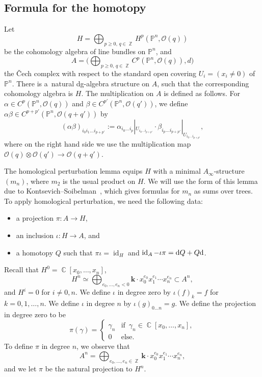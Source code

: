 \documentclass[10pt,a4paper]{amsart}
\numberwithin{equation}{section}
\DeclareMathOperator\C{\mathbb C}
\DeclareMathOperator\Z{\mathbb Z}
\renewcommand{\P}{{\mathbb P}}
\newcommand{\OO}{{\mathcal O}}
\newcommand{\sub}{\subset}
\newcommand{\id}{\operatorname{id}}
\renewcommand{\k}{{\mathbf{k}}}
\begin{document}
\subsection{Formula for the homotopy}

Let
\[
H=\bigoplus_{p\geq 0,\, q\in \Z}H^p(\P^n,\OO(q))
\]
be the cohomology algebra of line bundles on $\P^n$, and
\[
A=\Big(\bigoplus_{p\geq 0,\, q\in\Z} C^p (\P^n,\OO(q)),d\Big)
\]
the \v{C}ech complex with respect to the standard open covering $U_i=(x_i\neq 0)$ of $\P^n$.
There is a~natural dg-algebra structure on $A$, such that the corresponding cohomology algebra is
$H$. The multiplication on $A$ is defined as follows. For $\alpha \in C^p(\P^n,\OO(q))$ and $\beta\in C^{p'}(\P^n,\OO(q'))$, we define $\alpha\beta\in C^{p+p'}(\P^n,\OO(q+q'))$ by
\[
(\alpha\beta)_{i_0i_1\dots i_{p+p'}}:=\alpha_{i_0\dots i_p}|_{U_{i_0\dots i_{p+p'}}}\cdot \beta_{i_p\dots i_{p+p'}}|_{U_{i_0\dots i_{p+p'}}},
\]
where on the right hand side we use the multiplication map $\OO(q)\otimes \OO(q')\to \OO(q+q')$.

The homological perturbation lemma equips $H$ with a minimal $A_\infty$-structure $(m_n)$, where $m_2$ is the
usual product on $H$. We will use the form of this lemma due to Kontsevich--Soibelman~\cite{KS}, which gives formulas
for $m_n$ as sums over trees. To apply homological perturbation, we need the following data:
\begin{itemize}\itemsep=0pt
\item a projection $\pi\colon  A\to H$,
\item an inclusion $\iota\colon  H\to A$, and
\item a homotopy $Q$ such that $\pi\iota=\id_H$ and $\id_A-\iota\pi={\rm d}Q+Q{\rm d}$.
\end{itemize}
Recall that
 $H^0=\C[x_0,\dots ,x_n]$,
 \[
 H^n\simeq \bigoplus_{e_0,\dots ,e_n<0} \k\cdot x_0^{e_0}x_1^{e_1}\cdots x_n^{e_n}\sub A^n,
 \]
 and $H^i=0$ for $i\neq 0,n$. We define $\iota$ in degree zero by $\iota(f)_k=f$
 for $k=0,1,\dots ,n$. We define $\iota$ in degree $n$ by $\iota(g)_{0\ldots n}=g$. We define the projection
 in degree zero to be
\[
\pi(\gamma)=\begin{cases}
\gamma_n & \text{if } \, \gamma_n\in \C[x_0,\dots ,x_n],\\
0 & \text{else}.	
\end{cases}
\]
To define $\pi$ in degree $n$, we observe that
\[A^n=\bigoplus_{e_0,\dots ,e_n\in \Z}\k\cdot x_0^{e_0}x_1^{e_1}\cdots x_n^{e_n},\]
 and we let $\pi$ be the natural projection to $H^n$.
\end{document}
